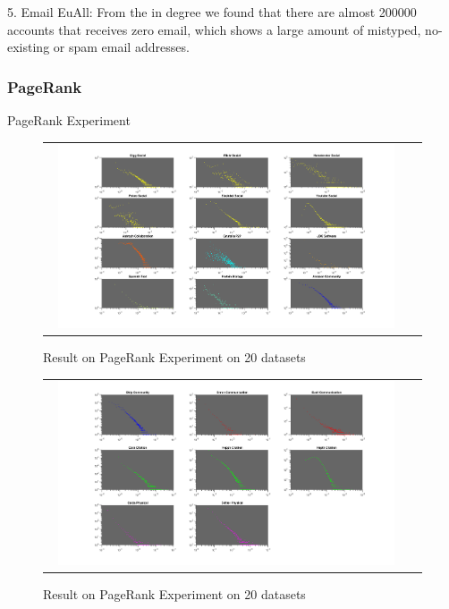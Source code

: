 5. Email EuAll: From the in degree we found that there are almost 200000 accounts that receives zero email, which shows a large amount of mistyped, no-existing or spam email addresses.

\subsubsection{PageRank}

PageRank Experiment

\begin{figure}[H]
\begin{center}
\begin{tabular}{cc}
     \includegraphics[width=0.95\textwidth]{FIG/pagerank1.png}
\end{tabular}
\caption{Result on PageRank Experiment on 20 datasets}
\end{center}
\end{figure}

\begin{figure}[H]
\begin{center}
\begin{tabular}{cc}
     \includegraphics[width=0.95\textwidth]{FIG/pagerank2.png}
\end{tabular}
\caption{Result on PageRank Experiment on 20 datasets}
\end{center}
\end{figure}

